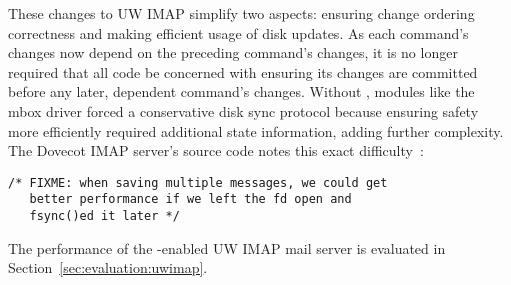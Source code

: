 These changes to UW IMAP simplify two aspects:
%
ensuring change ordering correctness
%
and making efficient usage of disk updates.
%
As each command's changes now depend on the preceding command's
changes, it is no longer required that all code be concerned with
ensuring its changes are committed before any later, dependent
command's changes. Without \opgroups, modules like the mbox driver
forced a conservative disk sync protocol because ensuring safety more
efficiently required additional state information, adding further
complexity. The Dovecot IMAP server's source code notes this exact
difficulty~\cite[maildir-save.c]{dovecot}:

\vspace{-0.5\baselineskip}
\begin{scriptsize}
\begin{verbatim}
/* FIXME: when saving multiple messages, we could get
   better performance if we left the fd open and
   fsync()ed it later */
\end{verbatim}
\end{scriptsize}
\vspace{-0.5\baselineskip}

The performance of the \opgroup{}-enabled UW IMAP mail server is
evaluated in Section~\ref{sec:evaluation:uwimap}.
